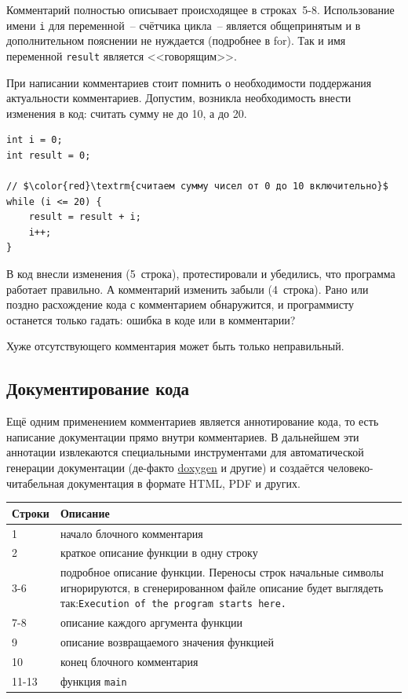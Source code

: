 \documentclass[myc.tex]{subfiles}
\begin{document}
Комментарий полностью описывает происходящее в строках~5-8. Использование имени \texttt{i} для переменной~-- счётчика цикла~-- является общепринятым и в дополнительном пояснении не нуждается (подробнее в for). %
Так и имя переменной \texttt{result} является <<говорящим>>.

При написании комментариев стоит помнить о необходимости поддержания актуальности комментариев. Допустим, возникла необходимость внести изменения в код: считать сумму не до 10, а до 20.
\begin{lstlisting}
int i = 0;
int result = 0;

// $\color{red}\textrm{считаем сумму чисел от 0 до 10 включительно}$
while (i <= 20) {
    result = result + i;
    i++;
}
\end{lstlisting}

В код внесли изменения (5~строка), протестировали и убедились, что программа работает правильно. А комментарий изменить забыли (4~строка). Рано или поздно расхождение кода с комментарием обнаружится, и программисту останется только гадать: ошибка в коде или в комментарии?

Хуже отсутствующего комментария может быть только неправильный.





\subsection{Документирование кода}

Ещё одним применением комментариев является аннотирование кода, то есть написание документации прямо внутри комментариев. В дальнейшем эти аннотации извлекаются специальными инструментами для автоматической генерации документации (де-факто \href{http://www.doxygen.nl/}{doxygen} и другие) и создаётся человеко-читабельная документация в формате HTML, PDF и других.


\noindent
\begin{small}
\begin{tabularx}{\textwidth}{|l|X|}
\hline
\textbf{Строки} & \textbf{Описание}\\
\hline
1 & начало блочного комментария\\
\hline
2 & краткое описание функции в одну строку\\
\hline
3-6 & подробное описание функции. Переносы строк начальные символы игнорируются, в сгенерированном файле описание будет выглядеть так:\newline \texttt{Execution of the program starts here.}\\
\hline
7-8 & описание каждого аргумента функции\\
\hline
9 & описание возвращаемого значения функцией\\
\hline
10 & конец блочного комментария\\
\hline
11-13 & функция \texttt{main}\\
\hline
\end{tabularx}
\end{small}
\end{document}
